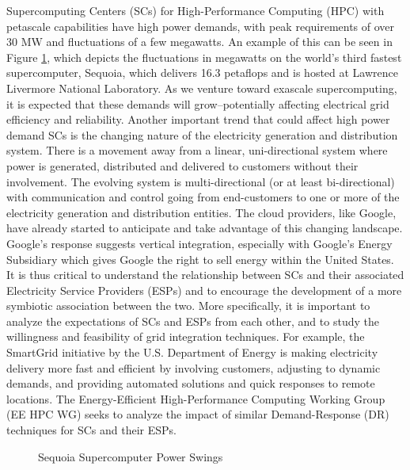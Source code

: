 \documentclass{llncs}
\begin{document}
Supercomputing Centers (SCs) for High-Performance Computing (HPC) with petascale capabilities have high power demands, with peak requirements of over 30 MW and fluctuations of a few megawatts. An example of this can be seen in Figure \ref{fig:seq}, which depicts the fluctuations in megawatts on the world's third fastest supercomputer, Sequoia, which delivers 16.3 petaflops and is hosted at Lawrence Livermore National Laboratory. As we venture toward exascale supercomputing, it is expected that these demands will grow--potentially affecting electrical grid efficiency and reliability.  Another important trend that could affect high power demand SCs is the changing nature of the electricity generation and distribution system.  There is a movement away from a linear, uni-directional system where power is generated, distributed and delivered to customers without their involvement.  The evolving system is multi-directional (or at least bi-directional) with communication and control going from end-customers to one or more of the electricity generation and distribution entities.  The cloud providers, like Google, have already started to anticipate and take advantage of this changing landscape.  Google's response suggests vertical integration, especially with Google's Energy Subsidiary which gives Google the right to sell energy within the United States.  It is thus critical to understand the relationship between SCs and their associated Electricity Service Providers (ESPs) and to encourage the development of a more symbiotic association between the two. More specifically, it is important to analyze the expectations of SCs and ESPs from each other, and to study the willingness and feasibility of grid integration techniques. For example, the SmartGrid initiative \cite{SmartGrid} by the U.S. Department of Energy is making electricity delivery more fast and efficient by involving customers, adjusting to dynamic demands, and providing automated solutions and quick responses to remote locations. The Energy-Efficient High-Performance Computing Working Group (EE HPC WG) seeks to analyze the impact of similar Demand-Response (DR) techniques for SCs and their ESPs. 

\begin{figure}
\begin{center}
\caption{Sequoia Supercomputer Power Swings}
\label{fig:seq}
\end{center}
\end{figure}
\end{document}
